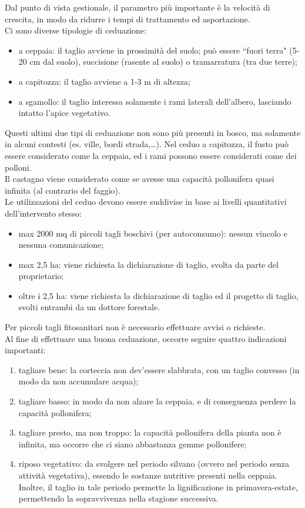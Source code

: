 \documentclass{article}
\begin{document}
Dal punto di vista gestionale, il parametro più importante è la velocità di crescita, in modo da ridurre i tempi di trattamento ed asportazione.\\
Ci sono diverse tipologie di ceduazione:
\begin{itemize}
    \item a ceppaia: il taglio avviene in prossimità del suolo; può essere ``fuori terra" (5-20 cm dal suolo), succisione (rasente al suolo) o tramarratura (tra due terre);
    \item a capitozza: il taglio avviene a 1-3 m di altezza;
    \item a sgamollo: il taglio interessa solamente i rami laterali dell'albero, lasciando intatto l'apice vegetativo.
\end{itemize}
Questi ultimi due tipi di ceduazione non sono più presenti in bosco, ma solamente in alcuni contesti (es. ville, bordi strada,\dots).
Nel ceduo a capitozza, il fusto può essere considerato come la ceppaia, ed i rami possono essere considerati come dei polloni.\\
Il castagno viene considerato come se avesse una capacità pollonifera quasi infinita (al contrario del faggio).\\
Le utilizzazioni del ceduo devono essere suddivise in base ai livelli quantitativi dell'intervento stesso:
\begin{itemize}
    \item max 2000 mq di piccoli tagli boschivi (per autoconsumo): nessun vincolo e nessuna comunicazione;
    \item max 2,5 ha: viene richiesta la dichiarazione di taglio, svolta da parte del proprietario;
    \item oltre i 2,5 ha: viene richiesta la dichiarazione di taglio ed il progetto di taglio, svolti entrambi da un dottore forestale.
\end{itemize}
Per piccoli tagli fitosanitari non è necessario effettuare avvisi o richieste.\\
Al fine di effettuare una buona ceduazione, occorre seguire quattro indicazioni importanti:
\begin{enumerate}
    \item tagliare bene: la corteccia non dev'essere slabbrata, con un taglio convesso (in modo da non accumulare acqua);
    \item tagliare basso: in modo da non alzare la ceppaia, e di conseguenza perdere la capacità pollonifera;
    \item tagliare presto, ma non troppo: la capacità pollonifera della pianta non è infinita, ma occorre che ci siano abbastanza gemme pollonifere;
    \item riposo vegetativo: da svolgere nel periodo silvano (ovvero nel periodo senza attività vegetativa), essendo le sostanze nutritive presenti nella ceppaia. Inoltre, il taglio in tale periodo permette la lignificazione in primavera-estate, permettendo la sopravvivenza nella stagione successiva.
\end{enumerate}
\end{document}
